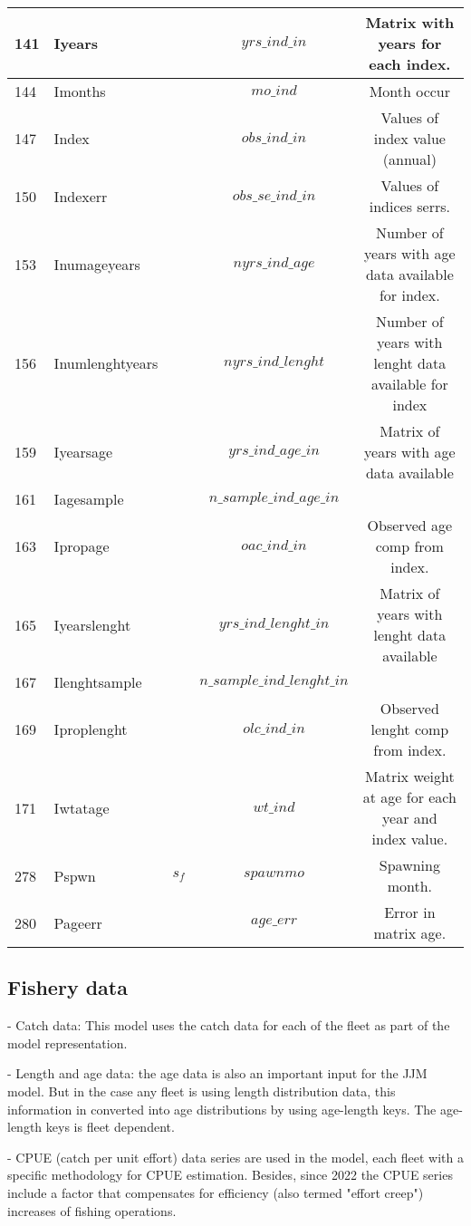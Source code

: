 \documentclass{article}
\begin{document}
\begin{tabular}{| p{0.9cm} | p{2.0cm} | p{1.8cm} | c | c |}
141 & Iyears &   & $yrs\_ind\_in$ & Matrix with years for each index.\\ \hline
144 & Imonths &   & $mo\_ind$ & Month occur \\ \hline
147 & Index &   & $obs\_ind\_in$ & Values of index value (annual)\\ \hline
150 & Indexerr &   & $obs\_se\_ind\_in$ & Values of indices serrs.\\ \hline
153 & Inumageyears &   & $nyrs\_ind\_age$ & Number of years with age data available for index.\\
\hline
156 & Inumlenghtyears &   & $nyrs\_ind\_lenght$ &  Number of years with lenght data available for index\\ \hline
159 & Iyearsage &   & $yrs\_ind\_age\_in$ & Matrix of years with age data available\\ \hline
161 & Iagesample &   & $n\_sample\_ind\_age\_in$ & \\ \hline
163 & Ipropage &   & $oac\_ind\_in$ & Observed age comp from index. \\ \hline
165 & Iyearslenght &   & $yrs\_ind\_lenght\_in$ & Matrix of years with lenght data available\\ \hline
167 & Ilenghtsample &   & $n\_sample\_ind\_lenght\_in$ & \\ \hline
169 & Iproplenght &   & $olc\_ind\_in$ & Observed lenght comp from index.\\ \hline
171 & Iwtatage &   & $wt\_ind$ & Matrix weight at age for each year and index value. \\ \hline
278 & Pspwn &  $s_f$ & $spawnmo$ & Spawning month.\\ \hline
280 & Pageerr &   & $age\_err$ & Error in matrix age.\\ \hline
\end{tabular} 

\subsection{Fishery data}

- Catch data: This model uses the catch data for each of the fleet as part of the model representation.

- Length and age data: the age data is also an important input for the JJM model. But in the case any fleet is using length distribution data, this information in converted into age distributions by using age-length keys. The age-length keys is fleet dependent.

- CPUE (catch per unit effort) data series are used in the model, each fleet with a specific methodology for CPUE estimation. Besides, since 2022 the CPUE series include a factor that compensates for efficiency (also termed "effort creep") increases of fishing operations.
\end{document}
